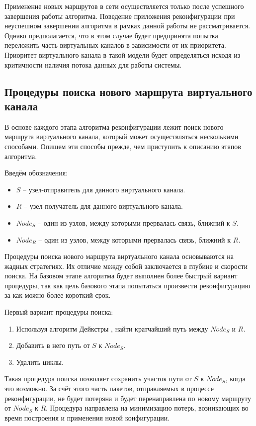 \documentclass[12pt, a4paper]{article}
\begin{document}
Применение новых маршрутов в сети осуществляется только после успешного завершения работы алгоритма. Поведение приложения реконфигурации при неуспешном завершении алгоритма в рамках данной работы не рассматривается. Однако предполагается, что в этом случае будет предпринята попытка переложить часть виртуальных каналов в зависимости от их приоритета. Приоритет виртуального канала в такой модели будет определяться исходя из критичности наличия потока данных для работы системы.  

\subsection{Процедуры поиска нового маршрута виртуального канала} \label{subsec:procalg}
В основе каждого этапа алгоритма реконфигурации лежит поиск нового маршрута виртуального канала, который может осуществляться несколькими способами. Опишем эти способы прежде, чем приступить к описанию этапов алгоритма.

Введём обозначения:
\begin{itemize}
	\item $S$ -- узел-отправитель для данного виртуального канала.
	\item $R$ -- узел-получатель для данного виртуального канала.
	\item $Node_{S}$ – один из узлов, между которыми прервалась связь, ближний к $S$.
	\item $Node_{R}$ – один из узлов, между которыми прервалась связь, ближний к $R$.
\end{itemize}

Процедуры поиска нового маршрута виртуального канала основываются на жадных стратегиях. Их отличие между собой заключается в глубине и скорости поиска. На базовом этапе алгоритма будет выполнен более быстрый вариант процедуры, так как цель базового этапа попытаться произвести реконфигурацию за как можно более короткий срок.

Первый вариант процедуры поиска:
\begin{enumerate}
	\item Используя алгоритм Дейкстры \cite{dejkstra}, найти кратчайший путь между $Node_{S}$ и $R$.
	\item Добавить в него путь от $S$ к $Node_{S}$.
	\item Удалить циклы.
\end{enumerate}

Такая процедура поиска позволяет сохранить участок пути от $S$ к $Node_{S}$, когда это возможно. За счёт этого часть пакетов, отправляемых в процессе реконфигурации, не будет потеряна и будет перенаправлена по новому маршруту от $Node_{S}$ к $R$. Процедура направлена на минимизацию потерь, возникающих во время построения и применения новой конфигурации.
\end{document}

